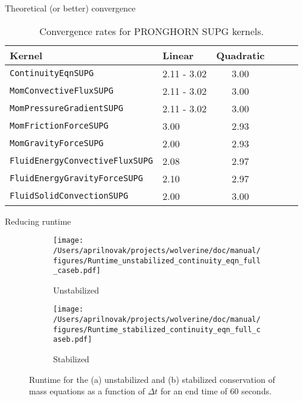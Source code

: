 \documentclass{beamer}
\begin{document}

\begin{frame}{Theoretical (or better) convergence}

\begin{table}[H]
\caption{Convergence rates for PRONGHORN SUPG kernels.}
\centering
\begin{tabular}{l l c c c c}
\hline\hline
Kernel  & Linear & Quadratic\\ [0.5ex]
\hline
\texttt{ContinuityEqnSUPG} 				& 2.11 - 3.02 & 3.00\\
\texttt{MomConvectiveFluxSUPG} 			& 2.11 - 3.02 & 3.00\\
\texttt{MomPressureGradientSUPG} 			& 2.11 - 3.02 & 3.00\\
\texttt{MomFrictionForceSUPG} 			& 3.00 & 2.93\\
\texttt{MomGravityForceSUPG } 			& 2.00 & 2.93\\
\texttt{FluidEnergyConvectiveFluxSUPG} 		& 2.08 & 2.97\\
\texttt{FluidEnergyGravityForceSUPG} 		& 2.10 & 2.97\\
\texttt{FluidSolidConvectionSUPG} 			& 2.00	     & 3.00\\			
\hline
\end{tabular}
\label{table:TestMatrixPlanSUPG}
\end{table}

\end{frame}

\begin{frame}{Reducing runtime}

\begin{figure}[H]
\centering
\begin{subfigure}{0.48\textwidth}
  \centering
  \texttt{[image: /Users/aprilnovak/projects/wolverine/doc/manual/figures/Runtime\_unstabilized\_continuity\_eqn\_full\_caseb.pdf]}
  \caption{Unstabilized}
\end{subfigure}
\begin{subfigure}{0.48\textwidth}
  \centering
  \texttt{[image: /Users/aprilnovak/projects/wolverine/doc/manual/figures/Runtime\_stabilized\_continuity\_eqn\_full\_caseb.pdf]}
  \caption{Stabilized}
\end{subfigure}
\caption{Runtime for the (a) unstabilized and (b) stabilized conservation of mass equations as a function of \(\Delta t\) for an end time of 60 seconds.}
\end{figure}

\end{frame}
\end{document}
